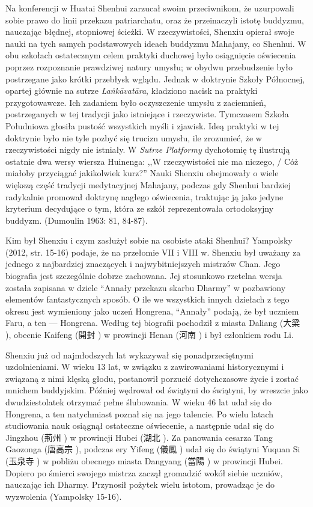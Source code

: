 Na konferencji w Huatai Shenhui zarzucał swoim przeciwnikom, że uzurpowali sobie prawo do linii przekazu patriarchatu, oraz że przeinaczyli istotę buddyzmu, nauczając błędnej, stopniowej ścieżki.
W rzeczywistości, Shenxiu opierał swoje nauki na tych samych podstawowych ideach buddyzmu Mahajany, co Shenhui.
W obu szkołach ostatecznym celem praktyki duchowej było osiągnięcie oświecenia poprzez rozpoznanie prawdziwej natury umysłu; w obydwu przebudzenie było postrzegane jako krótki przebłysk wglądu.
Jednak w doktrynie Szkoły Północnej, opartej głównie na sutrze \textit{La\.nkā\-vatāra}, kładziono nacisk na praktyki przygotowawcze.
Ich zadaniem było oczyszczenie umysłu z zaciemnień, postrzeganych w tej tradycji jako istniejące i rzeczywiste.
Tymczasem Szkoła Południowa głosiła pustość wszystkich myśli i zjawisk.
Ideą praktyki w tej doktrynie było nie tyle pozbyć się trucizn umysłu, ile zrozumieć, że w rzeczywistości nigdy nie istniały.
W \textit{Sutrze Platformy} dychotomię tę ilustrują ostatnie dwa wersy wiersza Huinenga: ,,W rzeczywistości nie ma niczego, / Cóż miałoby przyciągać jakikolwiek kurz?''
Nauki Shenxiu obejmowały o wiele większą część tradycji medytacyjnej Mahajany, podczas gdy Shenhui bardziej radykalnie promował doktrynę nagłego oświecenia, traktując ją jako jedyne kryterium decydujące o tym, która ze szkół reprezentowała ortodoksyjny buddyzm.
(Dumoulin 1963: 81, 84-87). %

Kim był Shenxiu i czym zasłużył sobie na osobiste ataki Shenhui? Yampolsky (2012, str. 15-16) podaje, że na przełomie VII i VIII w. Shenxiu był uważany za jednego z najbardziej znaczących i najwybitniejszych mistrzów Chan.
Jego biografia jest szczególnie dobrze zachowana. Jej stosunkowo rzetelna wersja została zapisana w dziele ``Annały przekazu skarbu Dharmy'' w pozbawiony elementów fantastycznych sposób. O ile we wszystkich innych dziełach z tego okresu jest wymieniony jako uczeń Hongrena, ``Annały'' podają, że był uczniem Faru, a ten --- Hongrena. Według tej biografii pochodził z miasta Daliang (大梁 ), obecnie Kaifeng (開封 ) w prowincji Henan (河南 ) i był członkiem rodu Li.

Shenxiu już od najmłodszych lat wykazywał się ponadprzeciętnymi uzdolnieniami.
W wieku 13 lat, w związku z zawirowaniami historycznymi i związaną z nimi klęską głodu, postanowił porzucić dotychczasowe życie i zostać mnichem buddyjskim.
Później wędrował od świątyni do świątyni, by wreszcie jako dwudziestolatek otrzymać pełne ślubowania.
W wieku 46 lat udał się do Hongrena, a ten natychmiast poznał się na jego talencie.
Po wielu latach studiowania nauk osiągnął ostateczne oświecenie, a następnie udał się do Jingzhou (荊州 ) w prowincji Hubei (湖北 ).
Za panowania cesarza Tang Gaozonga (唐高宗 ), podczas ery Yifeng (儀鳳 ) udał się do świątyni Yuquan Si (玉泉寺 ) w pobliżu obecnego miasta Dangyang (當陽 ) w prowincji Hubei.
Dopiero po śmierci swojego mistrza zaczął gromadzić wokół siebie uczniów, nauczając ich Dharmy. Przynosił pożytek wielu istotom, prowadząc je do wyzwolenia
(Yampolsky 15-16).

